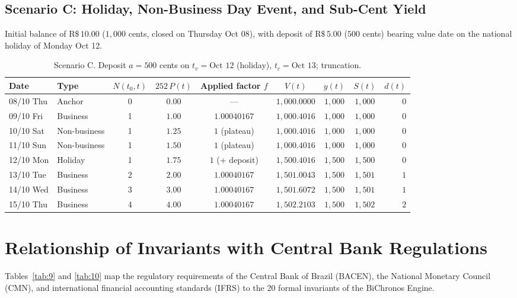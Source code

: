 \documentclass[11pt, a4paper]{article}
\theoremstyle{definition}
\theoremstyle{plain}
\theoremstyle{remark}
\begin{document}
\subsection{Scenario C: Holiday, Non-Business Day Event, and Sub-Cent Yield}\label{sec:7.3}

Initial balance of $\text{R\$}\,10.00$ ($1,000$ cents, closed on Thursday Oct 08), with deposit of $\text{R\$}\,5.00$ ($500$ cents) bearing value date on the national holiday of Monday Oct 12.

\begin{table}[htbp]
\centering
\small
\begin{tabular}{@{}llccccccr@{}}
\toprule
\textbf{Date} & \textbf{Type} & $N(t_0, t)$ & $252\,P(t)$ & \textbf{Applied factor $f$} & $V(t)$ & $y(t)$ & $S(t)$ & $d(t)$ \\
\midrule
08/10 Thu & Anchor       & 0 & $0.00$ & ---            & $1,000.0000$ & $1,000$ & $1,000$ & $0$ \\
09/10 Fri & Business     & 1 & $1.00$ & $1.00040167$   & $1,000.4016$ & $1,000$ & $1,000$ & $0$ \\
10/10 Sat & Non-business & 1 & $1.25$ & $1$ (plateau)  & $1,000.4016$ & $1,000$ & $1,000$ & $0$ \\
11/10 Sun & Non-business & 1 & $1.50$ & $1$ (plateau)  & $1,000.4016$ & $1,000$ & $1,000$ & $0$ \\
12/10 Mon & Holiday      & 1 & $1.75$ & $1$ (+ deposit)& $1,500.4016$ & $1,500$ & $1,500$ & $0$ \\
13/10 Tue & Business     & 2 & $2.00$ & $1.00040167$   & $1,501.0043$ & $1,500$ & $1,501$ & $1$ \\
14/10 Wed & Business     & 3 & $3.00$ & $1.00040167$   & $1,501.6072$ & $1,500$ & $1,501$ & $1$ \\
15/10 Thu & Business     & 4 & $4.00$ & $1.00040167$   & $1,502.2103$ & $1,500$ & $1,502$ & $2$ \\
\bottomrule
\end{tabular}
\caption{Scenario C. Deposit $a = 500$ cents on $t_v = \text{Oct 12}$ (holiday), $t_c = \text{Oct 13}$; truncation.}
\label{tab:8}
\end{table}

\section{Relationship of Invariants with Central Bank Regulations}\label{sec:8}

Tables~\ref{tab:9} and \ref{tab:10} map the regulatory requirements of the Central Bank of Brazil (BACEN), the National Monetary Council (CMN), and international financial accounting standards (IFRS) to the 20 formal invariants of the BiChronos Engine.
\end{document}
